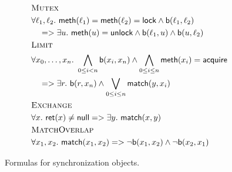 \begin{figure}
  \footnotesize
  \begin{align*}
    & \textsc{Mutex} \\
    & \forall \ell_1, \ell_2.\ {\sf meth}(\ell_1) = {\sf meth}(\ell_2) = {\sf lock} \land {\sf b}(\ell_1,\ell_2) \\
    & \quad => \exists u.\ {\sf meth}(u) = {\sf unlock} \land {\sf b}(\ell_1,u) \land {\sf b}(u,\ell_2)
    \\
    & \textsc{Limit} \\
    & \forall x_0,\dots,x_n.\ \bigwedge_{0 \leq i < n} {\sf b}(x_i,x_n) \land \bigwedge_{0 \leq i \leq n} {\sf meth}(x_i) = {\sf acquire} \\
    & \quad=> \exists r.\ {\sf b}(r,x_n) \land \bigvee_{0 \leq i \leq n} {\sf match}(y,x_i)
    \\
    & \textsc{Exchange} \\
    & \forall x.\ {\sf ret}(x) \neq {\sf null} =>  \exists y.\ {\sf match}(x,y)  \\
    & \textsc{MatchOverlap} \\
    & \forall x_1,x_2.\ {\sf match}(x_1,x_2) => \neg {\sf b}(x_1,x_2) \land \neg {\sf b}(x_2,x_1) 
  \end{align*}
  \caption{Formulas for synchronization objects.}
  \label{fig:formulas:synchronization}
\end{figure}




%
%
%


